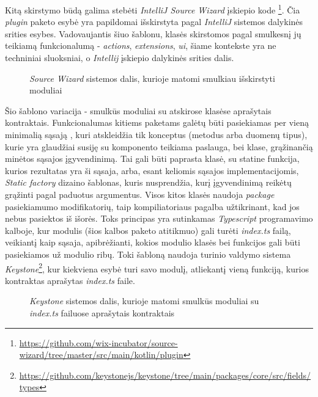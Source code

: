 Kitą skirstymo būdą galima stebėti \textit{IntelliJ Source Wizard} įskiepio kode \footnote{\url{https://github.com/wix-incubator/source-wizard/tree/master/src/main/kotlin/plugin}}.
Čia \textit{plugin} paketo esybė yra papildomai išskirstyta pagal \textit{IntelliJ} sistemos dalykinės srities esybes.
Vadovaujantis šiuo šablonu, klasės skirstomos pagal smulkesnį jų teikiamą funkcionalumą - \textit{actions}, \textit{extensions}, \textit{ui},
šiame kontekste yra ne techniniai sluoksniai, o \textit{Intellij} įskiepio dalykinės srities dalis.
\begin{figure}[H]
    \snugshade
    \endsnugshade
    \caption{\textit{Source Wizard} sistemos dalis, kurioje matomi smulkiau išskirstyti moduliai}
\end{figure}

Šio šablono variacija - smulkūs moduliai su atskirose klasėse aprašytais kontraktais.
Funkcionalumas kitiems paketams galėtų būti pasiekiamas per vieną minimalią sąsają ,
kuri atskleidžia tik konceptus (metodus arba duomenų tipus), kurie yra glaudžiai susiję su komponento teikiama paslauga, bei
klase, grąžinančią minėtos sąsajos įgyvendinimą.
Tai gali būti paprasta klasė, su statine funkcija, kurios rezultatas yra ši sąsaja, arba, esant keliomis sąsajos implementacijomis,
\textit{Static factory} dizaino šablonas, kuris nusprendžia, kurį įgyvendinimą reikėtų grąžinti pagal paduotus argumentus.
Visos kitos klasės naudoja \textit{package} pasiekiamumo modifikatorių, taip kompiliatoriaus pagalba užtikrinant,
kad jos nebus pasiektos iš išorės.
Toks principas yra sutinkamas \textit{Typescript} programavimo kalboje, kur modulis (šios kalbos paketo atitikmuo) gali turėti
\textit{index.ts} failą, veikiantį kaip sąsaja, apibrėžianti, kokios modulio klasės bei funkcijos gali būti pasiekiamos už modulio ribų.
Toki šabloną naudoja turinio valdymo sistema \textit{Keystone}\footnote{\url{https://github.com/keystonejs/keystone/tree/main/packages/core/src/fields/types}},
kur kiekviena esybė turi savo modulį, atliekantį vieną funkciją, kurios kontraktas aprašytas \textit{index.ts} faile.

\begin{figure}[H]
    \snugshade
    \endsnugshade
    \caption{\textit{Keystone} sistemos dalis, kurioje matomi smulkūs moduliai su \textit{index.ts} failuose aprašytais kontraktais}
\end{figure}

